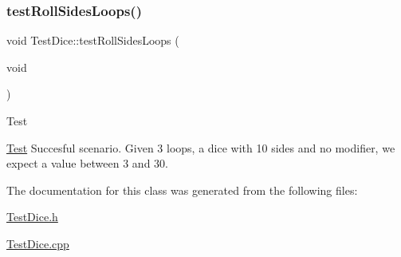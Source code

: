 \subsubsection{\texorpdfstring{test\+Roll\+Sides\+Loops()}{testRollSidesLoops()}}
{\footnotesize\ttfamily void Test\+Dice\+::test\+Roll\+Sides\+Loops (\begin{DoxyParamCaption}\item[{void}]{ }\end{DoxyParamCaption})\hspace{0.3cm}{\ttfamily [protected]}}

\begin{DoxyRefDesc}{Test}
\item[\hyperlink{test__test000003}{Test}]Succesful scenario. Given 3 loops, a dice with 10 sides and no modifier, we expect a value between 3 and 30. \end{DoxyRefDesc}


The documentation for this class was generated from the following files\+:\begin{DoxyCompactItemize}
\item 
\hyperlink{_test_dice_8h}{Test\+Dice.\+h}\item 
\hyperlink{_test_dice_8cpp}{Test\+Dice.\+cpp}\end{DoxyCompactItemize}
